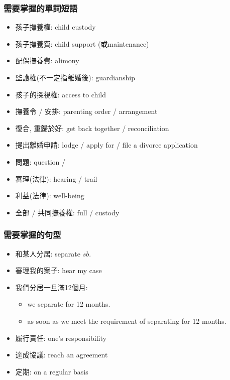 \subsubsection*{需要掌握的單詞短語}
\begin{multicols}{2}
\begin{itemize}
  \itemsep0em
  \item 孩子撫養權: child custody
  \item 孩子撫養費: child support (或maintenance)
  \item 配偶撫養費: alimony
  \item 監護權(不一定指離婚後): guardianship
  \item 孩子的探視權: access to child
  \item 撫養令 / 安排: parenting order / arrangement
  \item 復合, 重歸於好: get back together / reconciliation
  \item 提出離婚申請: lodge / apply for / file a divorce application
  \item 問題: question / 
  \item 審理(法律): hearing / trail
  \item 利益(法律): well-being
  \item 全部 / 共同撫養權: full /  custody
\end{itemize}
\end{multicols}

\subsubsection*{需要掌握的句型}
\begin{multicols}{2}
\begin{itemize}
  \itemsep0em
  \item 和某人分居: separate  $sb.$
  \item 審理我的案子: hear my case
  \item 我們分居一旦滿12個月:
  \begin{itemize}
    \item {} we separate for 12 months.
    \item as soon as we meet the requirement of separating for 12 months.
  \end{itemize}
  \item 履行責任:  one's responsibility  
  \item 達成協議: reach an agreement
  \item 定期: on a regular basis
\end{itemize}
\end{multicols}

